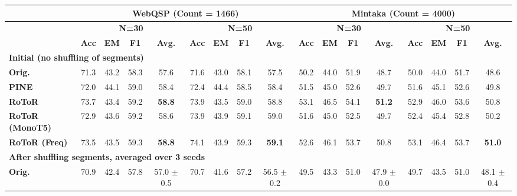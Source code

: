 \begin{table*}[t]
\centering
\resizebox{0.95\linewidth}{!}
{
\begin{tabular}{@{}lcccccccccccccccc@{}}
\toprule
\multicolumn{1}{l|}{} & \multicolumn{8}{c|}{\textbf{WebQSP (Count = 1466)}} & \multicolumn{8}{c}{\textbf{Mintaka (Count = 4000)}} \\ \midrule
\multicolumn{1}{l|}{} & \multicolumn{4}{c|}{\textbf{N=30}} & \multicolumn{4}{c|}{\textbf{N=50}} & \multicolumn{4}{c|}{\textbf{N=30}} & \multicolumn{4}{c}{\textbf{N=50}} \\ \cmidrule(l){2-17} 
\multicolumn{1}{l|}{} & \textbf{Acc} & \textbf{EM} & \textbf{F1} & \multicolumn{1}{c|}{\textbf{Avg.}} & \textbf{Acc} & \textbf{EM} & \textbf{F1} & \multicolumn{1}{c|}{\textbf{Avg.}} & \textbf{Acc} & \textbf{EM} & \textbf{F1} & \multicolumn{1}{c|}{\textbf{Avg.}} & \textbf{Acc} & \textbf{EM} & \textbf{F1} & \textbf{Avg.} \\ \midrule
\multicolumn{17}{l}{\textbf{Initial (no shuffling of segments)}} \\ \midrule
\multicolumn{1}{l|}{\textbf{Orig.}} & 71.3 & 43.2 & 58.3 & \multicolumn{1}{c|}{57.6} & 71.6 & 43.0 & 58.1 & \multicolumn{1}{c|}{57.5} & 50.2 & 44.0 & 51.9 & \multicolumn{1}{c|}{48.7} & 50.0 & 44.0 & 51.7 & 48.6 \\
\multicolumn{1}{l|}{\textbf{PINE}} & 72.0 & 44.1 & 59.0 & \multicolumn{1}{c|}{58.4} & 72.4 & 44.4 & 58.5 & \multicolumn{1}{c|}{58.4} & 51.5 & 45.0 & 52.6 & \multicolumn{1}{c|}{49.7} & 51.6 & 45.1 & 52.6 & 49.8 \\
\multicolumn{1}{l|}{\textbf{RoToR}} & 73.7 & 43.4 & 59.2 & \multicolumn{1}{c|}{\textbf{58.8}} & 73.9 & 43.5 & 59.0 & \multicolumn{1}{c|}{58.8} & 53.1 & 46.5 & 54.1 & \multicolumn{1}{c|}{\textbf{51.2}} & 52.9 & 46.0 & 53.6 & 50.8 \\
\multicolumn{1}{l|}{\textbf{RoToR (MonoT5)}} & 72.9 & 43.6 & 59.2 & \multicolumn{1}{c|}{58.6} & 73.9 & 43.9 & 59.1 & \multicolumn{1}{c|}{59.0} & 51.6 & 45.0 & 52.5 & \multicolumn{1}{c|}{49.7} & 52.4 & 45.4 & 52.8 & 50.2 \\
\multicolumn{1}{l|}{\textbf{RoToR (Freq)}} & 73.5 & 43.5 & 59.3 & \multicolumn{1}{c|}{\textbf{58.8}} & 74.1 & 43.9 & 59.3 & \multicolumn{1}{c|}{\textbf{59.1}} & 52.6 & 46.1 & 53.7 & \multicolumn{1}{c|}{50.8} & 53.1 & 46.4 & 53.7 & \textbf{51.0} \\ \midrule
\multicolumn{17}{l}{\textbf{After shuffling segments, averaged over 3 seeds}} \\ \midrule
\multicolumn{1}{l|}{\textbf{Orig.}} & 70.9 & 42.4 & 57.8 & \multicolumn{1}{c|}{57.0 \tiny{$\pm$ 0.5}} & 70.7 & 41.6 & 57.2 & \multicolumn{1}{c|}{56.5 \tiny{$\pm$ 0.2}} & 49.5 & 43.3 & 51.0 & \multicolumn{1}{c|}{47.9 \tiny{$\pm$ 0.0}} & 49.7 & 43.5 & 51.0 & 48.1 \tiny{$\pm$ 0.4} \\

\end{tabular}}
\end{table*}
